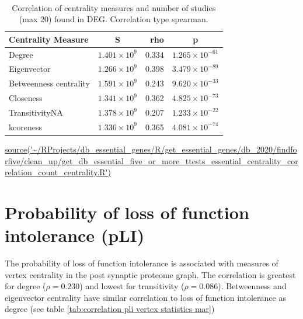 ﻿
﻿%
\begin{table}[ht]
\centering
\begin{tabular}{lcrc}
  \toprule
Centrality Measure & S & rho & p \\ 
  \midrule
 Degree  & $1.401 \times 10^{9}$ & 0.334 & $1.265 \times 10^{-61}$ \\ 
 Eigenvector   & $1.266 \times 10^{9}$ & 0.398 & $3.479 \times 10^{-89}$ \\ 
 Betweenness centrality   & $1.591 \times 10^{9}$ & 0.243 & $9.620 \times 10^{-33}$ \\ 
   Closeness   & $1.341 \times 10^{9}$ & 0.362 & $4.825 \times 10^{-73}$ \\ 
  TransitivityNA   & $1.378 \times 10^{9}$ & 0.207 & $1.233 \times 10^{-22}$ \\ 
  kcoreness   & $1.336 \times 10^{9}$ & 0.365 & $4.081 \times 10^{-74}$ \\ 
   \bottomrule
\end{tabular}
\caption{Correlation of centrality measures and number of studies (max 20) found in DEG. Correlation type spearman.}
\tiny\url{source('~/RProjects/db_essential_genes/R/get_essential_genes/db_2020/findforfive/clean_up/get_db_essential_five_or_more_ttests_essential_centrality_correlation_count_centrality.R')}
\label{tab:Correlation centrality and num studies DEG}
\end{table}


\section{Probability of loss of function intolerance (pLI)}
\label{sec: results pLI}


The probability of loss of function intolerance is associated with measures of vertex centrality in the post synaptic proteome graph. The correlation is greatest for degree ($\rho=0.230$) and lowest for transitivity ($\rho=0.086$). Betweenness and eigenvector centrality have similar correlation to loss of function intolerance as degree (see table \ref{tab:correlation pli vertex statistics mar})

